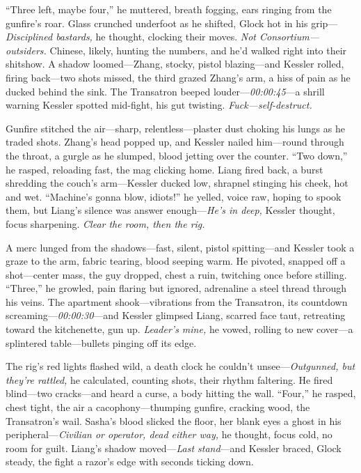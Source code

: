 \documentclass[12pt]{book}
\begin{document}
“Three left, maybe four,” he muttered, breath fogging, ears ringing from the gunfire’s roar. Glass crunched underfoot as he shifted, Glock hot in his grip—\textit{Disciplined bastards,} he thought, clocking their moves. \textit{Not Consortium—outsiders.} Chinese, likely, hunting the numbers, and he’d walked right into their shitshow. A shadow loomed—Zhang, stocky, pistol blazing—and Kessler rolled, firing back—two shots missed, the third grazed Zhang’s arm, a hiss of pain as he ducked behind the sink. The Transatron beeped louder—\textit{00:00:45}—a shrill warning Kessler spotted mid-fight, his gut twisting. \textit{Fuck—self-destruct.}

Gunfire stitched the air—sharp, relentless—plaster dust choking his lungs as he traded shots. Zhang’s head popped up, and Kessler nailed him—round through the throat, a gurgle as he slumped, blood jetting over the counter. “Two down,” he rasped, reloading fast, the mag clicking home. Liang fired back, a burst shredding the couch’s arm—Kessler ducked low, shrapnel stinging his cheek, hot and wet. “Machine’s gonna blow, idiots!” he yelled, voice raw, hoping to spook them, but Liang’s silence was answer enough—\textit{He’s in deep,} Kessler thought, focus sharpening. \textit{Clear the room, then the rig.}

A merc lunged from the shadows—fast, silent, pistol spitting—and Kessler took a graze to the arm, fabric tearing, blood seeping warm. He pivoted, snapped off a shot—center mass, the guy dropped, chest a ruin, twitching once before stilling. “Three,” he growled, pain flaring but ignored, adrenaline a steel thread through his veins. The apartment shook—vibrations from the Transatron, its countdown screaming—\textit{00:00:30}—and Kessler glimpsed Liang, scarred face taut, retreating toward the kitchenette, gun up. \textit{Leader’s mine,} he vowed, rolling to new cover—a splintered table—bullets pinging off its edge.

The rig’s red lights flashed wild, a death clock he couldn’t unsee—\textit{Outgunned, but they’re rattled,} he calculated, counting shots, their rhythm faltering. He fired blind—two cracks—and heard a curse, a body hitting the wall. “Four,” he rasped, chest tight, the air a cacophony—thumping gunfire, cracking wood, the Transatron’s wail. Sasha’s blood slicked the floor, her blank eyes a ghost in his peripheral—\textit{Civilian or operator, dead either way,} he thought, focus cold, no room for guilt. Liang’s shadow moved—\textit{Last stand}—and Kessler braced, Glock steady, the fight a razor’s edge with seconds ticking down.
\end{document}
